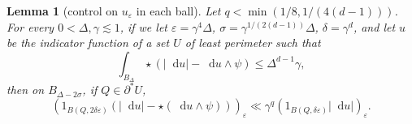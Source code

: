 \documentclass[reqno,12pt,letterpaper]{amsart}
\newcommand*\dif{\mathop{}\!\mathrm{d}}
\newtheorem{lemma}[theorem]{Lemma}
\theoremstyle{definition}
\numberwithin{equation}{section}
\begin{document}
\begin{lemma}[control on $u_\varepsilon$ in each ball]\label{mollifier sublemma}
Let $q < \min(1/8, 1/(4(d - 1)))$.
For every $0 < \Delta, \gamma \lesssim 1$, if we let $\varepsilon = \gamma^4 \Delta$, $\sigma = \gamma^{1/(2(d - 1))} \Delta$, $\delta = \gamma^d$, and let $u$ be the indicator function of a set $U$ of least perimeter such that
\begin{equation}\label{hypothesis on mollifier sublemma}
\int_{B_\Delta} \star(|\dif u| - \dif u \wedge \psi) \leq \Delta^{d - 1} \gamma,
\end{equation}
then on $B_{\Delta - 2\sigma}$, if $Q \in \partial^* U$,
$$(1_{B(Q, 2\delta\varepsilon)}(|\dif u| - \star(\dif u \wedge \psi)))_\varepsilon \ll \gamma^q (1_{B(Q, \delta\varepsilon)} |\dif u|)_\varepsilon.$$
\end{lemma}
\end{document}
